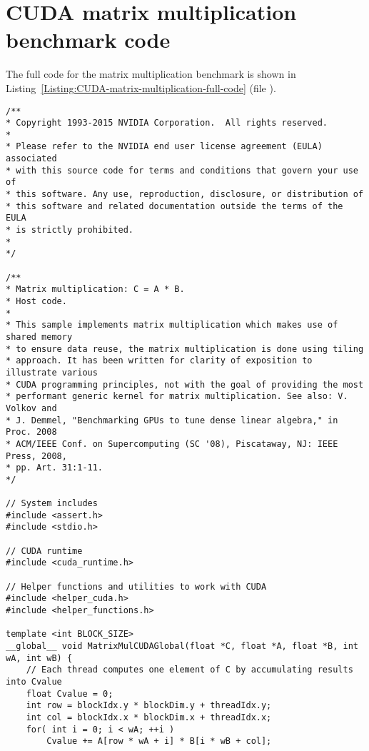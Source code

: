 \newpage 									%
\appendix 								 	%

\chapter{CUDA matrix multiplication benchmark code}\label{Attachment:CUDA-matrix-multiplication-code}
The full code for the matrix multiplication benchmark is shown in Listing~\ref{Listing:CUDA-matrix-multiplication-full-code} (file ).
\begin{lstlisting}[caption={Matrix multiplication benchmark code. Taken from Nvidia's samples located in the users home directory by default: \code{\$HOME/NVIDIA-samples/0\_Introduction/matrixMul/}.},label={Listing:CUDA-matrix-multiplication-full-code}]
/**
* Copyright 1993-2015 NVIDIA Corporation.  All rights reserved.
*
* Please refer to the NVIDIA end user license agreement (EULA) associated
* with this source code for terms and conditions that govern your use of
* this software. Any use, reproduction, disclosure, or distribution of
* this software and related documentation outside the terms of the EULA
* is strictly prohibited.
*
*/

/**
* Matrix multiplication: C = A * B.
* Host code.
*
* This sample implements matrix multiplication which makes use of shared memory
* to ensure data reuse, the matrix multiplication is done using tiling
* approach. It has been written for clarity of exposition to illustrate various
* CUDA programming principles, not with the goal of providing the most
* performant generic kernel for matrix multiplication. See also: V. Volkov and
* J. Demmel, "Benchmarking GPUs to tune dense linear algebra," in Proc. 2008
* ACM/IEEE Conf. on Supercomputing (SC '08), Piscataway, NJ: IEEE Press, 2008,
* pp. Art. 31:1-11.
*/

// System includes
#include <assert.h>
#include <stdio.h>

// CUDA runtime
#include <cuda_runtime.h>

// Helper functions and utilities to work with CUDA
#include <helper_cuda.h>
#include <helper_functions.h>

template <int BLOCK_SIZE>
__global__ void MatrixMulCUDAGlobal(float *C, float *A, float *B, int wA, int wB) {
	// Each thread computes one element of C by accumulating results into Cvalue
	float Cvalue = 0;
	int row = blockIdx.y * blockDim.y + threadIdx.y;
	int col = blockIdx.x * blockDim.x + threadIdx.x;
	for( int i = 0; i < wA; ++i )
		Cvalue += A[row * wA + i] * B[i * wB + col];
	

\end{lstlisting}
